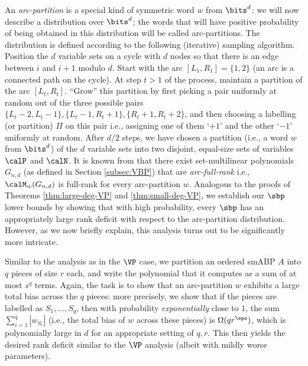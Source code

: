 \documentclass{article}
\begin{document}
An \emph{arc-partition} is a special kind of symmetric word $w$  from $\bits^d$: we will now describe a distribution over $\bits^d$; the words that will
have positive probability of being obtained in this distribution will be called arc-partitions. The
distribution is defined according to the following (iterative) sampling algorithm. Position the $d$
variable sets on a cycle with $d$ nodes so that there is an edge between $i$ and $i+ 1$ modulo $d$. Start with
the arc $[L_1, R_1] = \{1, 2\}$ (an arc is a connected path on the cycle). At step $t > 1$ of the process,
maintain a partition of the arc $[L_t
, R_t
]$. “Grow” this partition by first picking a pair uniformly
at random out of the three possible pairs $\{L_t - 2, L_t - 1\},\{L_t - 1, R_t + 1\},\{R_t + 1, R_t + 2\}$, and then choosing a labelling (or partition) $\Pi$ on this pair i.e., assigning one of them `$+1$' and the other `$-1$' uniformly at random. After $d/2$ steps, we have chosen a partition (i.e., a word $w$ from $\bits^d$) of the $d$ variable sets into two disjoint, equal-size
sets of variables $\calP$ and $\calN$. It is known from \cite{KushS23} that there exist set-multilinear polynomials $G_{n,d}$ (as defined in Section \ref{subsec:VBP}) that are \emph{arc-full-rank} i.e., $\calM_w(G_{n,d})$ is full-rank for every arc-partition $w$. Analogous to the proofs of Theorems \ref{thm:large-deg-VP} and \ref{thm:small-deg-VP}, we establish our $\sbp$ lower bounds by showing that with high probability, every $\sbp$ has an appropriately large rank deficit with respect to the arc-partition distribution.  However, as we now briefly explain, this analysis turns out to be significantly more intricate.

Similar to the analysis as in the $\VP$ case, we partition an ordered smABP $A$ into $q$ pieces of size $r$ each, and write the polynomial that it computes as a sum of at most $s^q$ terms. Again, the task is to show that an arc-partition $w$ exhibits a large total bias across the $q$ pieces: more precisely, we show that if the pieces are labelled as $S_1,\ldots,S_q$, then with probability \emph{exponentially} close to $1$, the sum $\sum_{i = 1}^q |w_{S_i}|$ (i.e., the total bias of $w$ across these pieces) is $\Omega (q r^\eps )$, which is polynomially large in $d$ for an appropriate setting of $q,r$. This then yields the desired rank deficit similar to the $\VP$ analysis (albeit with mildly worse parameters).
\end{document}

